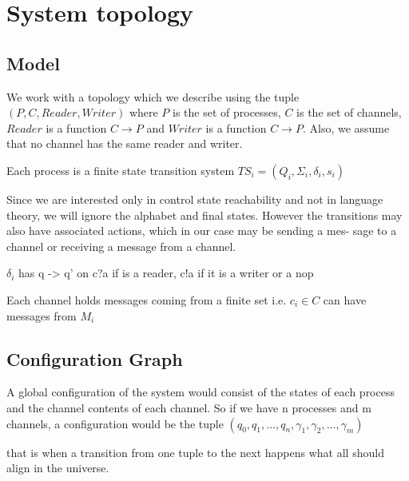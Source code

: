 \documentclass[a4paper,UKenglish,cleveref, autoref, thm-restate]{lipics-v2019}
\begin{document}






\section{System topology}

\subsection{Model}

We work with a topology which we describe using the tuple $(P, C, Reader, Writer)$ where $P$ is the set of processes, $C$ is the set of channels, $Reader$ is a function $C \rightarrow P$ and $Writer$ is a function $C \rightarrow P$. 
Also, we assume that no channel has the same reader and writer.


Each process is a finite state transition system $TS_i = (Q_i, \Sigma_i, \delta_i, s_i)$

Since we are interested only in control state reachability and not in language
theory, we will ignore the alphabet and final states. However the transitions
may also have associated actions, which in our case may be sending a mes-
sage to a channel or receiving a message from a channel. 


$\delta_i$ has q -> q' on  c?a if is a reader, c!a if it is a writer or a nop


Each channel holds messages coming from a finite set i.e. $c_i \in C$ can have messages from $M_i$ 

\subsection{Configuration Graph}

A global configuration of the system would consist of the states of each process and the channel contents of each channel. So if we have n processes and m channels, a configuration would be the tuple $(q_0, q_1, ..., q_n, \gamma_1, \gamma_2, ..., \gamma_m)$



that is when a transition from one tuple to the next happens what all should align in the universe.
\end{document}
